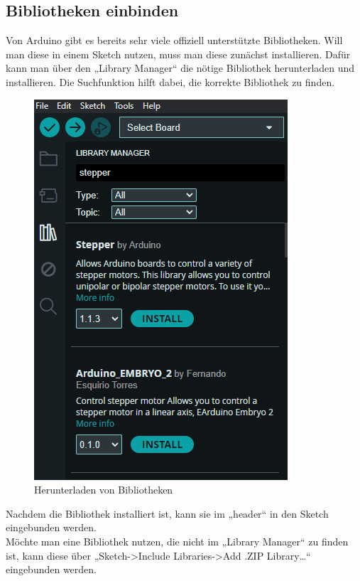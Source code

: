 \subsection{Bibliotheken einbinden}
Von Arduino gibt es bereits sehr viele offiziell unterstützte Bibliotheken. Will man diese in einem Sketch nutzen, muss man diese zunächst installieren.
Dafür kann man über den „Library Manager“ die nötige Bibliothek herunterladen und installieren. Die Suchfunktion hilft dabei, die korrekte Bibliothek zu finden.
\begin{figure}[htb]
	\begin{center}
		\includegraphics[width=\textwidth]{General/Librarymanager}
		\caption{Herunterladen von Bibliotheken} \label{Herunterladen von Bibliotheken}
	\end{center}
\end{figure}
Nachdem die Bibliothek installiert ist, kann sie im „header“ in den Sketch eingebunden werden.\\
Möchte man eine Bibliothek nutzen, die nicht im „Library Manager“ zu finden ist, kann diese über „Sketch->Include Libraries->Add .ZIP Library…“ eingebunden werden.

